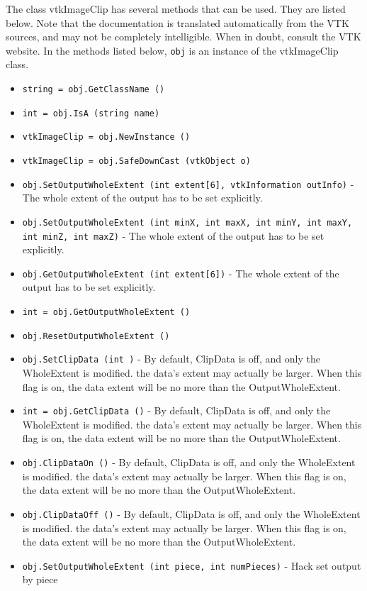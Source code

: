 The class vtkImageClip has several methods that can be used.
  They are listed below.
Note that the documentation is translated automatically from the VTK sources,
and may not be completely intelligible.  When in doubt, consult the VTK website.
In the methods listed below, \verb|obj| is an instance of the vtkImageClip class.
\begin{itemize}
\item  \verb|string = obj.GetClassName ()|

\item  \verb|int = obj.IsA (string name)|

\item  \verb|vtkImageClip = obj.NewInstance ()|

\item  \verb|vtkImageClip = obj.SafeDownCast (vtkObject o)|

\item  \verb|obj.SetOutputWholeExtent (int extent[6], vtkInformation outInfo)| -  The whole extent of the output has to be set explicitly.

\item  \verb|obj.SetOutputWholeExtent (int minX, int maxX, int minY, int maxY, int minZ, int maxZ)| -  The whole extent of the output has to be set explicitly.

\item  \verb|obj.GetOutputWholeExtent (int extent[6])| -  The whole extent of the output has to be set explicitly.

\item  \verb|int = obj.GetOutputWholeExtent ()|

\item  \verb|obj.ResetOutputWholeExtent ()|

\item  \verb|obj.SetClipData (int )| -  By default, ClipData is off, and only the WholeExtent is modified.
 the data's extent may actually be larger.  When this flag is on,
 the data extent will be no more than the OutputWholeExtent.

\item  \verb|int = obj.GetClipData ()| -  By default, ClipData is off, and only the WholeExtent is modified.
 the data's extent may actually be larger.  When this flag is on,
 the data extent will be no more than the OutputWholeExtent.

\item  \verb|obj.ClipDataOn ()| -  By default, ClipData is off, and only the WholeExtent is modified.
 the data's extent may actually be larger.  When this flag is on,
 the data extent will be no more than the OutputWholeExtent.

\item  \verb|obj.ClipDataOff ()| -  By default, ClipData is off, and only the WholeExtent is modified.
 the data's extent may actually be larger.  When this flag is on,
 the data extent will be no more than the OutputWholeExtent.

\item  \verb|obj.SetOutputWholeExtent (int piece, int numPieces)| -  Hack set output by piece

\end{itemize}
